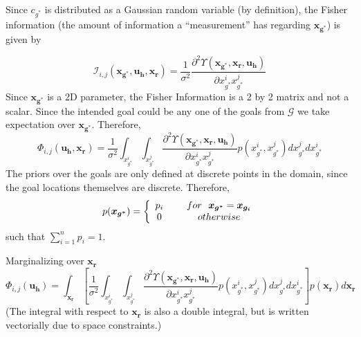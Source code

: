 \documentclass[]{article}
\begin{document}
Since $c_{g^*}$ is distributed as a Gaussian random variable (by definition), the Fisher information (the amount of information a ``measurement'' has regarding $\boldsymbol{x_{g^*}}$) is given by

\begin{equation*}
\mathcal{I}_{i,j}(\boldsymbol{x_{g^*}}, \boldsymbol{u_h}, \boldsymbol{x_r}) = \frac{1}{\sigma^2}\frac{\partial^2\Upsilon(\boldsymbol{x_{g^*}}, \boldsymbol{x_r}, \boldsymbol{u_h})}{\partial x_{g^*}^ix_{g^*}^j}
\end{equation*}
Since $\boldsymbol{x_{g^*}}$ is a 2D parameter, the Fisher Information is a 2 by 2 matrix and not a scalar.
\noindent Since the intended goal could be any one of the goals from $\mathcal{G}$ we take expectation over $\boldsymbol{x_{g^*}}$. Therefore, 
\begin{equation*}
\Phi_{i,j}(\boldsymbol{u_h}, \boldsymbol{x_r}) =
\frac{1}{\sigma^2}\int_{x_{g^*}^i}\int_{x_{g^*}^j}\frac{\partial^2\Upsilon(\boldsymbol{x_{g^*}}, \boldsymbol{x_r}, \boldsymbol{u_h})}{\partial x_{g^*}^ix_{g^*}^j}p(x_{g^*}^i, x_{g^*}^j)dx_{g^*}^jdx_{g^*}^i
\end{equation*}
The priors over the goals are only defined at discrete points in the domain, since the goal locations themselves are discrete. Therefore, 
\begin{align*}
p(\boldsymbol{x_{g^*}}) = \left\{ 
\begin{array}{cc} 
p_i & \hspace{5mm} for ~~ \boldsymbol{x_{g^*}} = \boldsymbol{x_{g_i}} \\
0 & \hspace{5mm} otherwise
\end{array}\right. 
\end{align*}
such that $\sum_{i=1}^{n} p_i = 1$.

\noindent Marginalizing over $\boldsymbol{x_r}$
\begin{equation*}
\Phi_{i,j}(\boldsymbol{u_h}) = \int_{\boldsymbol{x_r}}\left[\frac{1}{\sigma^2}\int_{x_{g^*}^i}\int_{x_{g^*}^j}\frac{\partial^2\Upsilon(\boldsymbol{x_{g^*}}, \boldsymbol{x_r}, \boldsymbol{u_h})}{\partial x_{g^*}^ix_{g^*}^j}p(x_{g^*}^i, x_{g^*}^j)dx_{g^*}^jdx_{g^*}^i\right]p(\boldsymbol{x_r})d\boldsymbol{x_r}
\end{equation*}
(The integral with respect to $\boldsymbol{x_r}$ is also a double integral, but is written vectorially due to space constraints.)
\end{document}
